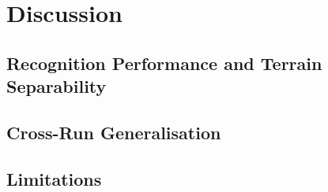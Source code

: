\chapter{Discussion}
\label{ch:discussion}


\section{Recognition Performance and Terrain Separability}

\section{Cross-Run Generalisation}

\section{Limitations}